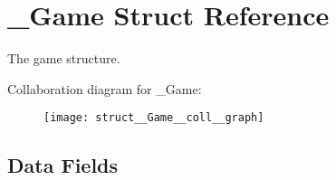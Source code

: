 \hypertarget{struct__Game}{}\section{\+\_\+\+Game Struct Reference}
\label{struct__Game}


The game structure.  




Collaboration diagram for \+\_\+\+Game\+:\nopagebreak
\begin{figure}[H]
\begin{center}
\leavevmode
\texttt{[image: struct\_\_Game\_\_coll\_\_graph]}
\end{center}
\end{figure}
\subsection*{Data Fields}
